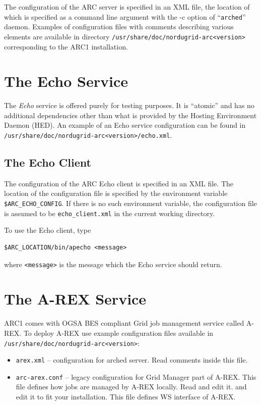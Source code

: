 \documentclass{article}                            %
\begin{document}
The configuration of the ARC server is specified in an XML file, the location of
which is specified as a command line argument with the -c option of
``\texttt{arched}'' daemon. Examples of configuration files with comments
describing various elements are available in directory
\texttt{/usr/share/doc/nordugrid-arc<version>} corresponding to the ARC1
installation.


\section{The Echo Service}
\label{sec:echo-service}

The \textit{Echo} service is offered purely for testing purposes. It is
``atomic'' and has no additional dependencies other than what is provided by the
Hosting Environment Daemon (HED). An example of an Echo service configuration
can be found in \texttt{/usr/share/doc/nordugrid-arc<version>/echo.xml}.


\subsection{The Echo Client}
\label{sec:echo-client}

The configuration of the ARC Echo client is specified in an XML
file. The location of the configuration file is specified by the
environment variable \verb|$ARC_ECHO_CONFIG|. If there is no such
environment
variable, the configuration file is assumed to be \verb|echo_client.xml| in
the current working directory.

To use the Echo client, type

\begin{lstlisting}
$ARC_LOCATION/bin/apecho <message>
\end{lstlisting}

where \verb|<message>| is the message which the Echo service should return.


\section{The A-REX Service}
\label{sec:a-rex}

ARC1 comes with OGSA BES compliant Grid job management service called A-REX.
To deploy A-REX use example configuration files available in
\verb|/usr/share/doc/nordugrid-arc<version>|:

\begin{itemize}
 \item \texttt{arex.xml} -- configuration for arched server. Read comments
inside this file.
 \item \texttt{arc-arex.conf} -- legacy configuration for Grid Manager part of
A-REX. This
file defines how jobs are managed by A-REX locally. Read and edit it.
and edit it to fit your installation. This file defines WS interface of A-REX.
\end{itemize}
\end{document}

